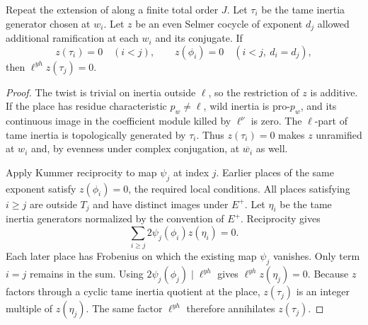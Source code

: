 \begin{lemma}
\label{lem:c-triangle-tame}
\emitthmsource
Repeat the extension of  along a finite total order $J$. Let $\tau_i$ be the tame inertia generator chosen at $w_i$. Let $z$ be an even Selmer cocycle of exponent $d_j$ allowed additional ramification at each $w_i$ and its conjugate. If
\[
 z(\tau_i)=0\quad(i<j),\qquad
 z(\phi_i)=0\quad(i<j,\ d_i=d_j),
\]
then $\ell^{yh}z(\tau_j)=0$.
\end{lemma}
\begin{proof}
The twist is trivial on inertia outside $\ell$, so the restriction of $z$ is additive. If the place has residue characteristic $p_w\ne\ell$, wild inertia is pro-$p_w$, and its continuous image in the coefficient module killed by $\ell^\nu$ is zero. The $\ell$-part of tame inertia is topologically generated by $\tau_i$. Thus $z(\tau_i)=0$ makes $z$ unramified at $w_i$ and, by evenness under complex conjugation, at $\overline{w_i}$ as well.

Apply Kummer reciprocity to map $\psi_j$ at index $j$. Earlier places of the same exponent satisfy $z(\phi_i)=0$, the required local conditions. All places satisfying $i\ge j$ are outside $T_j$ and have distinct images under $E^+$. Let $\eta_i$ be the tame inertia generators normalized by the convention of $E^+$. Reciprocity gives
\[
 \sum_{i\ge j}2\psi_j(\phi_i)z(\eta_i)=0.
\]
Each later place has Frobenius on which the existing map $\psi_j$ vanishes. Only term $i=j$ remains in the sum. Using $2\psi_j(\phi_j)\mid\ell^{yh}$ gives $\ell^{yh}z(\eta_j)=0$. Because $z$ factors through a cyclic tame inertia quotient at the place, $z(\tau_j)$ is an integer multiple of $z(\eta_j)$. The same factor $\ell^{yh}$ therefore annihilates $z(\tau_j)$.
\end{proof}

